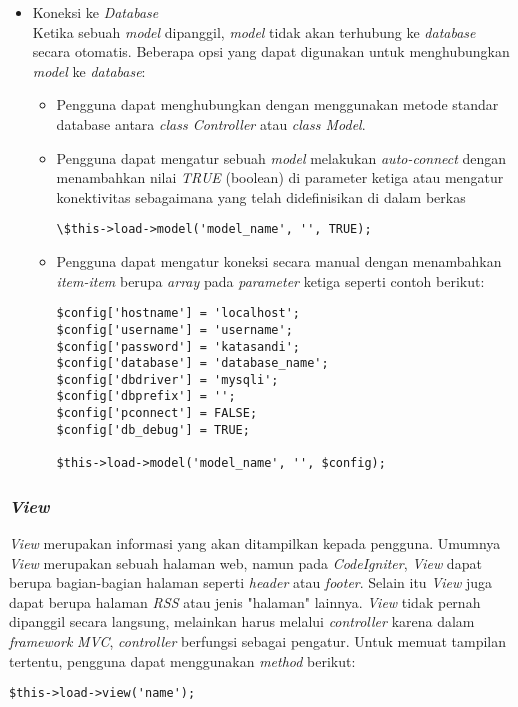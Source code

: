 \begin{itemize}
		\item Koneksi ke \textit{Database} \\
		Ketika sebuah \textit{model} dipanggil, \textit{model} tidak akan terhubung ke \textit{database} secara otomatis. Beberapa opsi yang dapat digunakan untuk menghubungkan \textit{model} ke \textit{database}:
		\begin{itemize}
			\item Pengguna dapat menghubungkan dengan menggunakan metode standar database antara \textit{class Controller} atau \textit{class Model}. \\
			\item Pengguna dapat mengatur sebuah \textit{model} melakukan \textit{auto-connect} dengan menambahkan nilai \textit{TRUE} (boolean) di parameter ketiga atau mengatur konektivitas sebagaimana yang telah didefinisikan di dalam berkas 
			\begin{lstlisting}[basicstyle=\ttfamily, frame=single,
columns=fullflexible, keepspaces=true, breaklines=true]
\$this->load->model('model_name', '', TRUE);
\end{lstlisting}
			\item Pengguna dapat mengatur koneksi secara manual dengan menambahkan \textit{item-item} berupa \textit{array} pada \textit{parameter} ketiga seperti contoh berikut:
			\begin{lstlisting}[basicstyle=\ttfamily, frame=single,
columns=fullflexible, keepspaces=true, breaklines=true]
$config['hostname'] = 'localhost';
$config['username'] = 'username';
$config['password'] = 'katasandi';
$config['database'] = 'database_name';
$config['dbdriver'] = 'mysqli';
$config['dbprefix'] = '';
$config['pconnect'] = FALSE;
$config['db_debug'] = TRUE;
			
$this->load->model('model_name', '', $config);
\end{lstlisting}
		\end{itemize}
	\end{itemize}
	
	\subsubsection{\textit{View}}
	\textit{View} merupakan informasi yang akan ditampilkan kepada pengguna. Umumnya \textit{View} merupakan sebuah halaman web, namun pada \textit{CodeIgniter}, \textit{View} dapat berupa bagian-bagian halaman seperti \textit{header} atau \textit{footer}. Selain itu \textit{View} juga dapat berupa halaman \textit{RSS} atau jenis "halaman" lainnya. \textit{View} tidak pernah dipanggil secara langsung, melainkan harus melalui \textit{controller} karena dalam \textit{framework} \textit{MVC}, \textit{controller} berfungsi sebagai pengatur. Untuk memuat tampilan tertentu, pengguna dapat menggunakan \textit{method} berikut:
	\begin{lstlisting}[basicstyle=\ttfamily, frame=single,
columns=fullflexible, keepspaces=true, breaklines=true]
$this->load->view('name');
\end{lstlisting}
	
